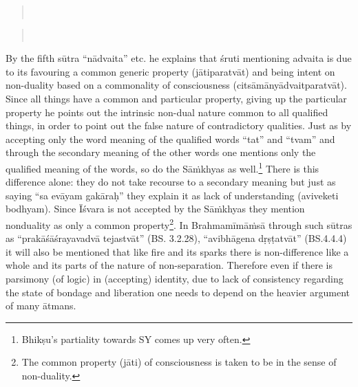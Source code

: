 \begin{verse}
\\
\end{verse}
\begin{verse}
\\
\end{verse}


By the fifth sūtra “nādvaita” etc. he explains that śruti mentioning advaita is due to its favouring a common generic property (jātiparatvāt) and being intent on non-duality based on a commonality of consciousness (citsāmānyādvaitparatvāt). Since all things have a common and particular property, giving up the particular property he points out the intrinsic non-dual nature common to all qualified things, in order to point out the false nature of contradictory qualities. Just as by accepting only the word meaning of the qualified words   “tat” and “tvam” and through the  secondary meaning of the other words one mentions only the qualified meaning of the words, so do the Sāṁkhyas as well.\footnote{Bhikṣu’s partiality towards SY comes up very often.} There is this difference alone: they do not take recourse to a secondary meaning but just as saying “sa evāyam gakāraḥ” they explain it as lack of understanding (aviveketi bodhyam). Since Īśvara is not accepted by the Sāṁkhyas they mention nonduality as only a common property\footnote{The common property (jāti) of consciousness is taken to be in the sense of non-duality.}. In Brahmamīmāṁsā through such sūtras as “prakāśāśrayavadvā tejastvāt” (BS. 3.2.28), “avibhāgena dṛṣṭatvāt” (BS.4.4.4) it will also be mentioned that like fire and its sparks there is non-difference like a whole and its parts of the nature of non-separation. Therefore even if there is parsimony (of logic) in  (accepting) identity, due to lack of consistency regarding the state of bondage and liberation one needs to depend on the heavier argument of many ātmans. 


